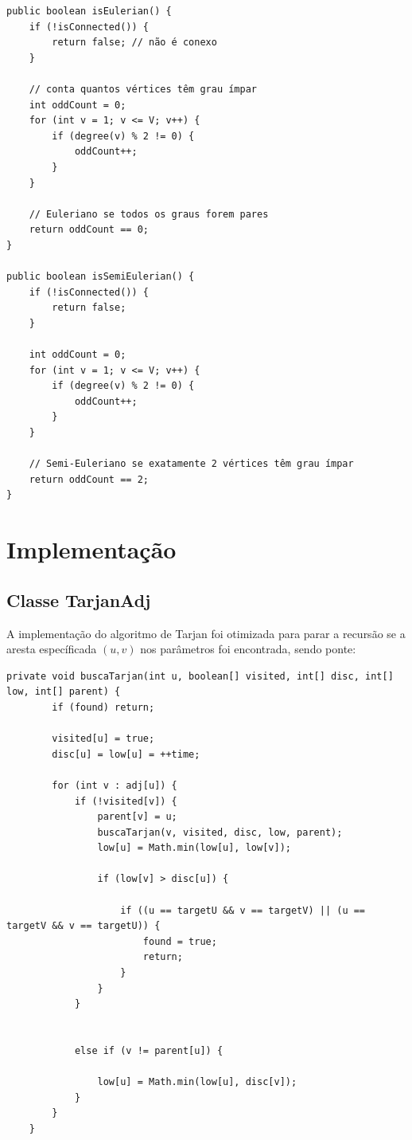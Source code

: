 \documentclass[12pt]{article}
\begin{document}
\begin{lstlisting}[style=javastyle, caption={M\'etodos para verificar se um grafo \'e Euleriano ou Semi-Euleriano.}, label={code:eulerian_check}]
public boolean isEulerian() {
    if (!isConnected()) {
        return false; // não é conexo
    }

    // conta quantos vértices têm grau ímpar
    int oddCount = 0;
    for (int v = 1; v <= V; v++) {
        if (degree(v) % 2 != 0) {
            oddCount++;
        }
    }

    // Euleriano se todos os graus forem pares
    return oddCount == 0;
}

public boolean isSemiEulerian() {
    if (!isConnected()) {
        return false;
    }

    int oddCount = 0;
    for (int v = 1; v <= V; v++) {
        if (degree(v) % 2 != 0) {
            oddCount++;
        }
    }

    // Semi-Euleriano se exatamente 2 vértices têm grau ímpar
    return oddCount == 2;
}
\end{lstlisting}


\section{Implementação}

\subsection{Classe TarjanAdj}

A implementação do algoritmo de Tarjan foi otimizada para parar a recursão  se a aresta específicada $(u,v)$ nos parâmetros foi encontrada, sendo ponte: \\

\begin{lstlisting}[style=javastyle, caption={M\'etodo para verificar se uma aresta espec\'ifica  \'e ponte.}, label={code:isBridgeTarjan}]
    private void buscaTarjan(int u, boolean[] visited, int[] disc, int[] low, int[] parent) {
        if (found) return; 
        
        visited[u] = true;
        disc[u] = low[u] = ++time;

        for (int v : adj[u]) {
            if (!visited[v]) {
                parent[v] = u; 
                buscaTarjan(v, visited, disc, low, parent);
                low[u] = Math.min(low[u], low[v]);
                
                if (low[v] > disc[u]) {
                    
                    if ((u == targetU && v == targetV) || (u == targetV && v == targetU)) {
                        found = true; 
                        return;       
                    }
                }
            }

       
            else if (v != parent[u]) {
            
                low[u] = Math.min(low[u], disc[v]);
            }
        }
    }
\end{lstlisting}
\end{document}
